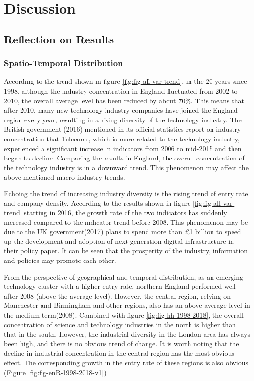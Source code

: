 \documentclass[
  12pt,
  oneside]{book}
\begin{document}
\hypertarget{discussion}{%
\chapter{Discussion}\label{discussion}}

\hypertarget{reflection-on-results}{%
\section{Reflection on Results}\label{reflection-on-results}}

\hypertarget{spatio-temporal-distribution}{%
\subsection{Spatio-Temporal Distribution}\label{spatio-temporal-distribution}}

According to the trend shown in figure \ref{fig:fig-all-var-trend}, in the 20 years since 1998, although the industry concentration in England fluctuated from 2002 to 2010, the overall average level has been reduced by about 70\%. This means that after 2010, many new technology industry companies have joined the England region every year, resulting in a rising diversity of the technology industry. The British government (2016) mentioned in its official statistics report on industry concentration that Telecoms, which is more related to the technology industry, experienced a significant increase in indicators from 2006 to mid-2015 and then began to decline. Comparing the results in England, the overall concentration of the technology industry is in a downward trend. This phenomenon may affect the above-mentioned macro-industry trends.

Echoing the trend of increasing industry diversity is the rising trend of entry rate and company density. According to the results shown in figure \ref{fig:fig-all-var-trend} starting in 2016, the growth rate of the two indicators has suddenly increased compared to the indicator trend before 2008. This phenomenon may be due to the UK government(2017) plans to spend more than £1 billion to speed up the development and adoption of next-generation digital infrastructure in their policy paper. It can be seen that the prosperity of the industry, information and policies may promote each other.

From the perspective of geographical and temporal distribution, as an emerging technology cluster with a higher entry rate, northern England performed well after 2008 (above the average level). However, the central region, relying on Manchester and Birmingham and other regions, also has an above-average level in the medium term(2008). Combined with figure \ref{fig:fig-hh-1998-2018}, the overall concentration of science and technology industries in the north is higher than that in the south. However, the industrial diversity in the London area has always been high, and there is no obvious trend of change. It is worth noting that the decline in industrial concentration in the central region has the most obvious effect. The corresponding growth in the entry rate of these regions is also obvious (Figure \ref{fig:fig-enR-1998-2018-v1})
\end{document}
